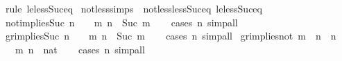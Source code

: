\begin{isabellebody}
\ {\isacharparenleft}{\kern0pt}rule\ le{\isacharunderscore}{\kern0pt}less{\isacharunderscore}{\kern0pt}Suc{\isacharunderscore}{\kern0pt}eq{\isacharparenright}{\kern0pt}%
\endisatagproof
{\isafoldproof}%
%
\isadelimproof
\isanewline
%
\endisadelimproof
\isanewline
{}\isamarkupfalse%
\ not{\isacharunderscore}{\kern0pt}less{\isacharunderscore}{\kern0pt}simps\ {\isacharequal}{\kern0pt}\ not{\isacharunderscore}{\kern0pt}less{\isacharunderscore}{\kern0pt}less{\isacharunderscore}{\kern0pt}Suc{\isacharunderscore}{\kern0pt}eq\ le{\isacharunderscore}{\kern0pt}less{\isacharunderscore}{\kern0pt}Suc{\isacharunderscore}{\kern0pt}eq\isanewline
\isanewline
{}\isamarkupfalse%
\ not{}{\isacharunderscore}{\kern0pt}implies{\isacharunderscore}{\kern0pt}Suc{\isacharcolon}{\kern0pt}\ {\isachardoublequoteopen}n\ {\isasymnoteq}\ {}\ {\isasymLongrightarrow}\ {\isasymexists}m{\isachardot}{\kern0pt}\ n\ {\isacharequal}{\kern0pt}\ Suc\ m{\isachardoublequoteclose}\isanewline
%
\isadelimproof
\ \ %
\endisadelimproof
%
\isatagproof
{}\isamarkupfalse%
\ {\isacharparenleft}{\kern0pt}cases\ n{\isacharparenright}{\kern0pt}\ simp{\isacharunderscore}{\kern0pt}all%
\endisatagproof
{\isafoldproof}%
%
\isadelimproof
\isanewline
%
\endisadelimproof
\isanewline
{}\isamarkupfalse%
\ gr{}{\isacharunderscore}{\kern0pt}implies{\isacharunderscore}{\kern0pt}Suc{\isacharcolon}{\kern0pt}\ {\isachardoublequoteopen}n\ {\isachargreater}{\kern0pt}\ {}\ {\isasymLongrightarrow}\ {\isasymexists}m{\isachardot}{\kern0pt}\ n\ {\isacharequal}{\kern0pt}\ Suc\ m{\isachardoublequoteclose}\isanewline
%
\isadelimproof
\ \ %
\endisadelimproof
%
\isatagproof
{}\isamarkupfalse%
\ {\isacharparenleft}{\kern0pt}cases\ n{\isacharparenright}{\kern0pt}\ simp{\isacharunderscore}{\kern0pt}all%
\endisatagproof
{\isafoldproof}%
%
\isadelimproof
\isanewline
%
\endisadelimproof
\isanewline
{}\isamarkupfalse%
\ gr{\isacharunderscore}{\kern0pt}implies{\isacharunderscore}{\kern0pt}not{}{\isacharcolon}{\kern0pt}\ {\isachardoublequoteopen}m\ {\isacharless}{\kern0pt}\ n\ {\isasymLongrightarrow}\ n\ {\isasymnoteq}\ {}{\isachardoublequoteclose}\isanewline
\ \ \ m\ n\ {\isacharcolon}{\kern0pt}{\isacharcolon}{\kern0pt}\ nat\isanewline
%
\isadelimproof
\ \ %
\endisadelimproof
%
\isatagproof
{}\isamarkupfalse%
\ {\isacharparenleft}{\kern0pt}cases\ n{\isacharparenright}{\kern0pt}\ simp{\isacharunderscore}{\kern0pt}all%
\endisatagproof
{\isafoldproof}%
%
\isadelimproof

\end{isabellebody}
